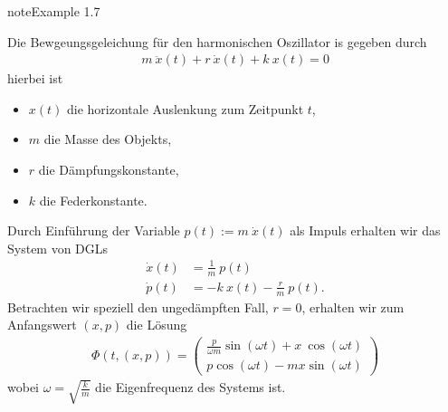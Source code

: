 \documentclass[letterpaper,10pt,english]{jupyterBook}
\begin{document}
\begin{sphinxadmonition}{note}{Example 1.7}



\sphinxAtStartPar
Die Bewgeungsgeleichung für den harmonischen Oszillator is gegeben durch
\begin{equation*}
\begin{split}m~\ddot{x}(t) + r~\dot{x}(t) + k~x(t)=0\end{split}
\end{equation*}
\sphinxAtStartPar
hierbei ist
\begin{itemize}
\item {} 
\sphinxAtStartPar
\(x(t)\) die horizontale Auslenkung zum Zeitpunkt \(t\),

\item {} 
\sphinxAtStartPar
\(m\) die Masse des Objekts,

\item {} 
\sphinxAtStartPar
\(r\) die Dämpfungskonstante,

\item {} 
\sphinxAtStartPar
\(k\) die Federkonstante.

\end{itemize}

\sphinxAtStartPar
Durch Einführung der Variable \(p(t):= m~\dot{x}(t)\) als Impuls erhalten wir das System von DGLs
\begin{equation*}
\begin{split}\dot{x}(t) &= \frac{1}{m}~p(t) \\
\dot{p}(t) &= -k~x(t) - \frac{r}{m}~p(t).\end{split}
\end{equation*}
\sphinxAtStartPar
Betrachten wir speziell den ungedämpften Fall, \(r=0\), erhalten wir zum Anfangswert \((x,p)\) die Lösung
\begin{equation*}
\begin{split}\Phi(t, (x,p)) = 
\begin{pmatrix}
\frac{p}{\omega m}\sin(\omega t) + x~\cos(\omega t)\\
p \cos(\omega t) - m x \sin(\omega t)
\end{pmatrix}\end{split}
\end{equation*}
\sphinxAtStartPar
wobei \(\omega=\sqrt{\frac{k}{m}}\) die Eigenfrequenz des Systems ist.
\end{sphinxadmonition}

\noindent{}
\end{document}
